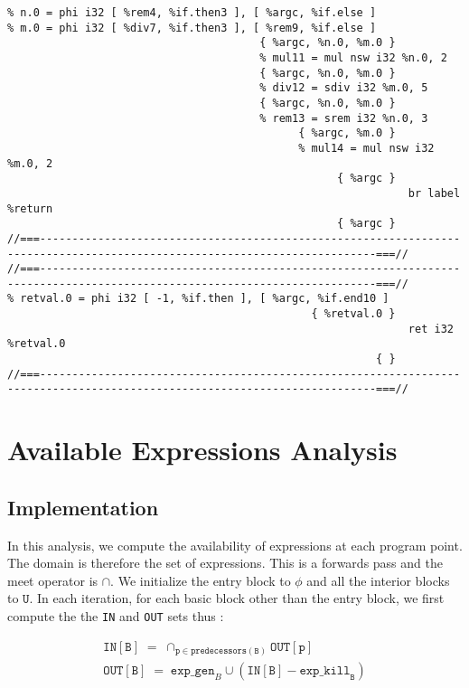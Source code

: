 \begin{verbatim}
% n.0 = phi i32 [ %rem4, %if.then3 ], [ %argc, %if.else ]
% m.0 = phi i32 [ %div7, %if.then3 ], [ %rem9, %if.else ]
                                       { %argc, %n.0, %m.0 }
                                       % mul11 = mul nsw i32 %n.0, 2
                                       { %argc, %n.0, %m.0 }
                                       % div12 = sdiv i32 %m.0, 5
                                       { %argc, %n.0, %m.0 }
                                       % rem13 = srem i32 %n.0, 3
                                             { %argc, %m.0 }
                                             % mul14 = mul nsw i32 %m.0, 2
                                                   { %argc }
                                                              br label %return
                                                   { %argc }
//===--------------------------------------------------------------------------------------------------------------------------===//
//===--------------------------------------------------------------------------------------------------------------------------===//
% retval.0 = phi i32 [ -1, %if.then ], [ %argc, %if.end10 ]
                                               { %retval.0 }
                                                              ret i32 %retval.0
                                                         { }
//===--------------------------------------------------------------------------------------------------------------------------===//
\end{verbatim}
\endgroup

\section{Available Expressions Analysis}

\subsection{Implementation}

In this analysis, we compute the availability of expressions at each program point.
The domain is therefore the set of expressions.
This is a forwards pass and the meet operator is $\cap$.
We initialize the entry block to $\phi$  and all the interior blocks to $\mathtt{U}$.
In each iteration, for each basic block other than the entry block, we
first compute the the \texttt{IN} and \texttt{OUT} sets thus :

\begin{align*}
\texttt{IN}[\mathtt{B}] \; = \; \cap_{\mathtt{p} \in \texttt{predecessors}(\mathtt{B})} \texttt{OUT}[\texttt{p}] \\
\texttt{OUT}[\mathtt{B}] \; = \; \texttt{exp\_gen}_{B} \cup (\texttt{IN}[\mathtt{B}] - \texttt{exp\_kill}_{\texttt{B}})
\end{align*}

